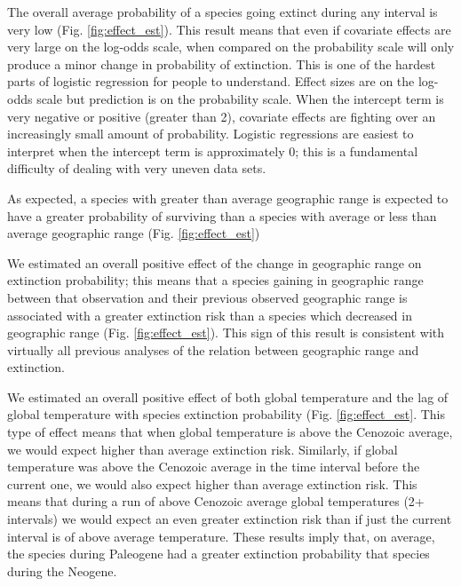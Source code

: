 \documentclass[12pt,letterpaper]{article}
\begin{document}
The overall average probability of a species going extinct during any interval is very low (Fig. \ref{fig:effect_est}). This result means that even if covariate effects are very large on the log-odds scale, when compared on the probability scale will only produce a minor change in probability of extinction. This is one of the hardest parts of logistic regression for people to understand. Effect sizes are on the log-odds scale but prediction is on the probability scale. When the intercept term is very negative or positive (greater than 2), covariate effects are fighting over an increasingly small amount of probability. Logistic regressions are easiest to interpret when the intercept term is approximately 0; this is a fundamental difficulty of dealing with very uneven data sets.

As expected, a species with greater than average geographic range is expected to have a greater probability of surviving than a species with average or less than average geographic range (Fig. \ref{fig:effect_est})

We estimated an overall positive effect of the change in geographic range on extinction probability; this means that a species gaining in geographic range between that observation and their previous observed geographic range is associated with a greater extinction risk than a species which decreased in geographic range (Fig. \ref{fig:effect_est}). This sign of this result is consistent with virtually all previous analyses of the relation between geographic range and extinction.

We estimated an overall positive effect of both global temperature and the lag of global temperature with species extinction probability (Fig. \ref{fig:effect_est}. This type of effect means that when global temperature is above the Cenozoic average, we would expect higher than average extinction risk. Similarly, if global temperature was above the Cenozoic average in the time interval before the current one, we would also expect higher than average extinction risk. This means that during a run of above Cenozoic average global temperatures (2+ intervals) we would expect an even greater extinction risk than if just the current interval is of above average temperature. These results imply that, on average, the species during Paleogene had a greater extinction probability that species during the Neogene.
\end{document}
